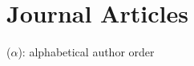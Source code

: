 \documentclass{article}
\begin{document}
    \section{Journal Articles}
    
    \renewcommand{\labelenumi}{J\theenumi.}
    {\footnotesize($\alpha$): alphabetical author order}
    
%        
%    
%   
    
    \begin{etaremune}
    [itemsep=0.2ex,
        leftmargin=4.8ex]
        
    \end{etaremune}
    
    
    
\end{document}
